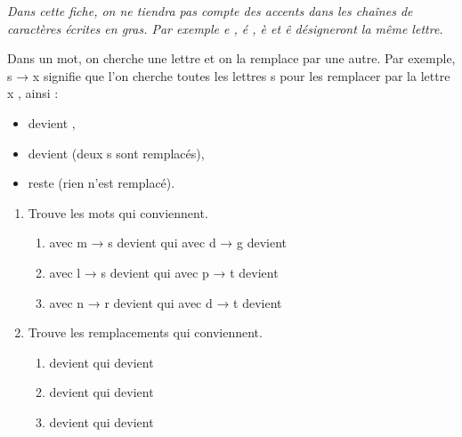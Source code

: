 \documentclass[class=report,crop=false, 12pt]{standalone}
\begin{document}

\emph{Dans cette fiche, on ne tiendra pas compte des accents dans les chaînes de caractères écrites en gras. Par exemple \og e \fg{}, \og é \fg{}, \og è \fg{} et \og ê \fg{} désigneront la même lettre.}

\bigskip
\bigskip

\begin{activite}

Dans un mot, on cherche une lettre et on la remplace par une autre. Par exemple, \og s → x \fg{} signifie que l'on cherche toutes les lettres \og s \fg{} pour les remplacer par la lettre \og x \fg{}, ainsi :
  
\begin{itemize}
  \item {} devient ,
  \item {} devient  (deux \og s \fg{} sont remplacés),
  \item {} reste  (rien n'est remplacé).
\end{itemize}

\begin{enumerate}
  \item Trouve les mots qui conviennent.

  \begin{enumerate}
    \item {} avec  \og m → s \fg{} devient  qui avec \og d → g \fg{} devient 
    \item {} avec \og l → s \fg{} devient  qui avec \og p → t \fg{} devient 
    \item {} avec \og n → r \fg{} devient  qui avec \og d → t \fg{} devient  
  \end{enumerate}  
  
  \item Trouve les remplacements qui conviennent.
  \begin{enumerate}
    \item {} devient  qui devient 
    \item {} devient  qui devient 
    \item {} devient  qui devient 
  \end{enumerate}  
  
\end{enumerate}

\end{activite}
\end{document}
